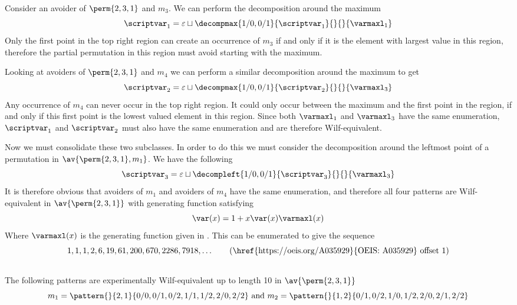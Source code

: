Consider an avoider of \(\perm{2,3,1}\) and \(m_3\). We can perform
the decomposition around the maximum
\begin{equation*}
    \scriptvar_1 = \varepsilon \sqcup
    \decompmax{1/0,0/1}{\scriptvar_1}{}{}{\mathcal{\varmaxl}_1}
\end{equation*}
Only the first point in the top right region can
create an occurrence of \(m_3\) if and only if it is the
element with largest value in this region, therefore the partial permutation
in this region must avoid starting with the maximum.

Looking at avoiders of \(\perm{2,3,1}\) and \(m_4\) we
can perform a similar decomposition around the maximum to get
\begin{equation*}
    \scriptvar_2 = \varepsilon \sqcup
    \decompmax{1/0,0/1}{\scriptvar_2}{}{}{\mathcal{\varmaxl}_3}
\end{equation*}
Any occurrence of \(m_4\) can never occur in the
top right region. It could only occur between the maximum and the first point
in the region, if and only if this first point is the lowest valued element in
this region.
Since both \(\mathcal{\varmaxl}_1\) and \(\mathcal{\varmaxl}_3\) have the same
enumeration, \(\scriptvar_1\) and \(\scriptvar_2\) must also have
the same enumeration and are therefore Wilf-equivalent.

Now we must consolidate these two subclasses. In order to do this we must
consider the decomposition around the leftmost point of a permutation in
\(\av{\perm{2,3,1},m_1}\). We have the following
\begin{equation*}
    \scriptvar_3 = \varepsilon \sqcup
    \decompleft{1/0,0/1}{\scriptvar_3}{}{}{\mathcal{\varmaxl}_3}
\end{equation*}
It is therefore obvious that avoiders of \(m_1\) and avoiders of \(m_4\)
have the same enumeration, and therefore all four patterns are Wilf-equivalent
in \(\av{\perm{2,3,1}}\) with generating function satisfying
\begin{equation*}
    \var(x) = 1 + x\var(x)\varmaxl(x)
\end{equation*}
Where \(\varmaxl(x)\) is the generating function given in .
This can be enumerated to give the sequence
\begin{equation*}
    1, 1, 1, 2, 6, 19, 61, 200, 670, 2286, 7918,\dotsc \tag{\href{https://oeis.org/A035929}{OEIS: A035929} offset 1}
\end{equation*}

\subsection{}
\nextvar
The following patterns are experimentally Wilf-equivalent up to length 10 in
\(\av{\perm{2,3,1}}\)
\begin{equation*}
    m_1 = \pattern{}{2,1}{0/0,0/1,0/2,
                    1/1,1/2,
                    2/0,2/2}
    \text{ and }
    m_2 = \pattern{}{1,2}{0/1,0/2,
                    1/0,1/2,
                    2/0,2/1,2/2}
\end{equation*}

